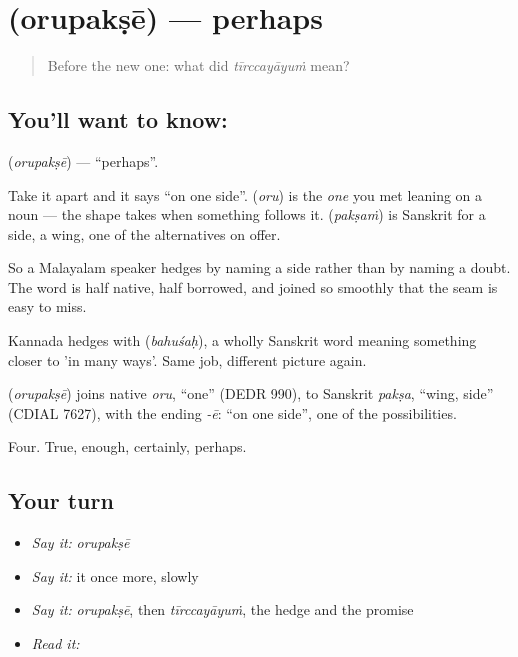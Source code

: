 \section[\texorpdfstring{\ml{ഒരുപക്ഷേ} (orupakṣē)}{ഒരുപക്ഷേ (orupakṣē)}]{ (orupakṣē) — perhaps}

\label{lesson:ML-C49-perhaps}



\begin{quote}
Before the new one: what did \emph{tīrccayāyuṁ} mean?
\end{quote}

\subsection*{You'll want to know: }
\textbf{} (\emph{orupakṣē}) — \textquotedblleft{}perhaps\textquotedblright{}.

Take it apart and it says \textquotedblleft{}on one side\textquotedblright{}.  (\emph{oru}) is the \emph{one} you met leaning on a noun — the shape  takes when something follows it.  (\emph{pakṣaṁ}) is Sanskrit for a side, a wing, one of the alternatives on offer.

So a Malayalam speaker hedges by naming a side rather than by naming a doubt. The word is half native, half borrowed, and joined so smoothly that the seam is easy to miss.

Kannada hedges with  (\emph{bahuśaḥ}), a wholly Sanskrit word meaning something closer to 'in many ways'. Same job, different picture again.

\begin{cousinweb}
\textbf{} (\emph{orupakṣē}) joins native \emph{oru}, \textquotedblleft{}one\textquotedblright{} (DEDR 990), to Sanskrit \emph{pakṣa}, \textquotedblleft{}wing, side\textquotedblright{} (CDIAL 7627), with the ending \emph{-ē}: \textquotedblleft{}on one side\textquotedblright{}, one of the possibilities.
\end{cousinweb}

\begin{grammarlens}[title={What you've built}]
Four. True, enough, certainly, perhaps.
\end{grammarlens}

\subsection*{Your turn}
\begin{itemize}
\raggedright
  \item \emph{Say it:} \emph{orupakṣē}
  \item \emph{Say it:} it once more, slowly
  \item \emph{Say it:} \emph{orupakṣē}, then \emph{tīrccayāyuṁ}, the hedge and the promise
  \item \emph{Read it:} \textbf{}
\end{itemize}

